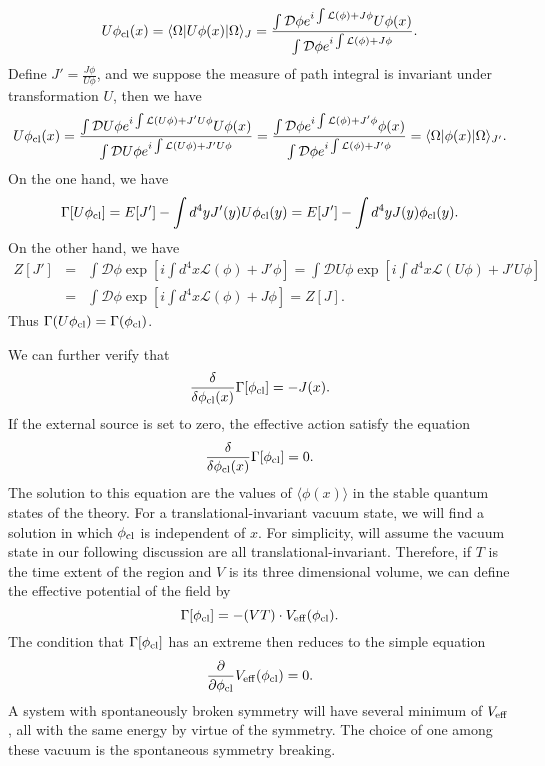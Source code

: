 \begin{newproof}
\[ U\phi_{\rm cl}(x) = \langle \Omega | U\phi(x) | \Omega\rangle_{J} = \frac{\int \mathcal{D}\phi e^{i \int \mathcal{L}(\phi)+J\phi}U\phi(x)}{\int \mathcal{D}\phi e^{i \int \mathcal{L}(\phi)+J\phi}}.\]
Define $J' = \frac{J\phi}{U\phi}$,  and we suppose the measure of path integral is invariant under transformation $U$, then we have
\[ U\phi_{\rm cl}(x) = \frac{\int \mathcal{D}U\phi e^{i \int \mathcal{L}(U\phi)+J'U\phi}U\phi(x)}{\int \mathcal{D}U\phi e^{i \int \mathcal{L}(U\phi)+J'U\phi}} =  \frac{\int \mathcal{D}\phi e^{i \int \mathcal{L}(\phi)+J'\phi}\phi(x)}{\int \mathcal{D}\phi e^{i \int \mathcal{L}(\phi)+J'\phi}} = \langle \Omega | \phi(x) | \Omega\rangle_{J'}.\]
On the one hand, we have
\[\Gamma[U\phi_{\rm cl}] = E[J'] - \int d^4y J'(y)U\phi_{\rm cl}(y) =  E[J'] - \int d^4y J(y)\phi_{\rm cl}(y).\]
On the other hand, we have
\begin{eqnarray}
Z[J'] &=& \int \mathcal{D}\phi \exp \left[ i \int d^4x \mathcal{L}(\phi)+J'\phi \right] =  \int \mathcal{D}U\phi \exp \left[ i \int d^4x \mathcal{L}(U\phi)+J'U\phi \right] \nonumber
\\
&=& \int \mathcal{D}\phi \exp \left[ i \int d^4x \mathcal{L}(\phi)+J\phi \right] = Z[J] .\nonumber
\end{eqnarray}
Thus $\Gamma(U\phi_{\rm cl}) = \Gamma(\phi_{\rm cl})$.
\end{newproof}

\noindent
We can further verify that
\[\frac{\delta}{\delta \phi_{\rm cl}(x)} \Gamma[\phi_{\rm cl}] = -J(x).\]
If the external source is set to zero, the effective action satisfy the equation
\[\frac{\delta}{\delta \phi_{\rm cl}(x)} \Gamma[\phi_{\rm cl}] = 0.\]
The solution to this equation are the values of $\langle \phi(x) \rangle$ in the stable quantum states of the theory. For a translational-invariant vacuum state, we will find a solution in which $\phi_{\rm cl}$ is independent of $x$. For simplicity, will assume the vacuum state in our following discussion are all translational-invariant. 
Therefore, if $T$ is the time extent of the region and $V$ is its three dimensional volume, we can define the effective potential of the field by
\[\Gamma[\phi_{\rm cl}] = -(VT) \cdot V_{\rm eff}(\phi_{\rm cl}).\]
The condition that $\Gamma[\phi_{\rm cl}]$ has an extreme then reduces to the simple equation
\[\frac{\partial}{\partial \phi_{\rm cl}} V_{\rm eff}(\phi_{\rm cl}) = 0.\] 
A system with spontaneously broken symmetry will have several minimum of $V_{\rm eff}$, all with the same energy by virtue of the symmetry. The choice of one among these vacuum is the spontaneous symmetry breaking.

